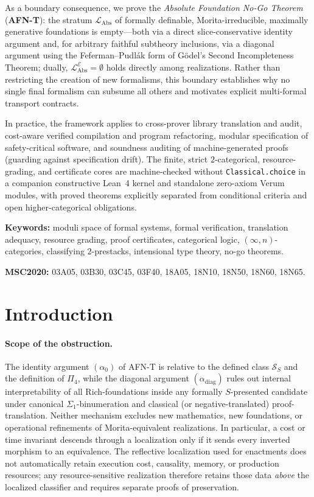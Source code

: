 \documentclass[11pt]{article}
\theoremstyle{plain}
\theoremstyle{definition}
\newcommand{\cS}{\mathcal{S}}
\newcommand{\LAbs}{\mathcal{L}_{\mathrm{Abs}}}
\newcommand{\cE}{\mathcal{E}}
\renewenvironment{abstract}{%
  \small
  \begin{center}\bfseries \abstractname\end{center}\vspace{-0.55em}%
  \list{}{\leftmargin=0.45em \rightmargin=0.45em \topsep=0pt \partopsep=0pt \parsep=1.5pt \listparindent=1.2em}%
  \item\relax
}{\endlist}
\begin{document}
\begin{abstract}
As a boundary consequence, we prove the \emph{Absolute Foundation No-Go Theorem} (\textbf{AFN-T}): the stratum $\LAbs$ of formally definable, Morita-irreducible, maximally generative foundations is empty---both via a direct slice-conservative identity argument and, for arbitrary faithful subtheory inclusions, via a diagonal argument using the Feferman--Pudl\'ak form of G\"odel's Second Incompleteness Theorem; dually, $\LAbs^\cE = \emptyset$ holds directly among realizations. Rather than restricting the creation of new formalisms, this boundary establishes why no single final formalism can subsume all others and motivates explicit multi-formal transport contracts.

In practice, the framework applies to cross-prover library translation and audit, cost-aware verified compilation and program refactoring, modular specification of safety-critical software, and soundness auditing of machine-generated proofs (guarding against specification drift). The finite, strict $2$-categorical, resource-grading, and certificate cores are machine-checked without \texttt{Classical.choice} in a companion constructive Lean~4 kernel and standalone zero-axiom Verum modules, with proved theorems explicitly separated from conditional criteria and open higher-categorical obligations.

\smallskip
\noindent\textbf{Keywords:} moduli space of formal systems, formal verification, translation adequacy, resource grading, proof certificates, categorical logic, $(\infty, n)$-categories, classifying $2$-prestacks, intensional type theory, no-go theorems.

\smallskip
\noindent\textbf{MSC2020:} 03A05, 03B30, 03C45, 03F40, 18A05, 18N10, 18N50, 18N60, 18N65.

\end{abstract}

\newpage
\tableofcontents
\smallskip
\listoffigures
\newpage

\section{Introduction}

\paragraph{Scope of the obstruction.}
The identity argument $(\alpha_0)$ of AFN-T is relative to the defined class $\cS_S$ and the definition of $\Pi_4$, while the diagonal argument $(\alpha_{\mathrm{diag}})$ rules out internal interpretability of all Rich-foundations inside any formally $S$-presented candidate under canonical $\Sigma_1$-binumeration and classical (or negative-translated) proof-translation. Neither mechanism excludes new mathematics, new foundations, or operational refinements of Morita-equivalent realizations. In particular, a cost or time invariant descends through a localization only if it sends every inverted morphism to an equivalence. The reflective localization used for enactments does not automatically retain execution cost, causality, memory, or production resources; any resource-sensitive realization therefore retains those data \emph{above} the localized classifier and requires separate proofs of preservation.
\end{document}
